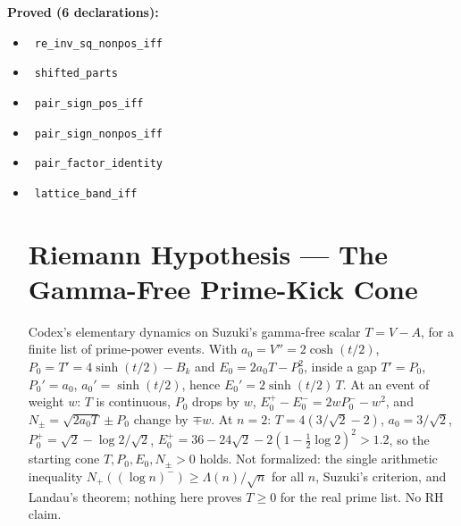\documentclass{report}
\theoremstyle{definition}
\begin{document}
\noindent\textbf{Proved (6 declarations):}
\begin{itemize}
  \item {}\leanok\ \texttt{re\_inv\_sq\_nonpos\_iff}
  \item {}\leanok\ \texttt{shifted\_parts}
  \item {}\leanok\ \texttt{pair\_sign\_pos\_iff}
  \item {}\leanok\ \texttt{pair\_sign\_nonpos\_iff}
  \item {}\leanok\ \texttt{pair\_factor\_identity}
  \item {}\leanok\ \texttt{lattice\_band\_iff}
\section{Riemann Hypothesis --- The Gamma-Free Prime-Kick Cone}
Codex's elementary dynamics on Suzuki's gamma-free scalar $T=V-A$, for a finite list of prime-power events. With $a_0=V''=2\cosh(t/2)$, $P_0=T'=4\sinh(t/2)-B_k$ and $E_0=2a_0T-P_0^2$, inside a gap $T'=P_0$, $P_0'=a_0$, $a_0'=\sinh(t/2)$, hence $E_0'=2\sinh(t/2)\,T$. At an event of weight $w$: $T$ is continuous, $P_0$ drops by $w$, $E_0^+-E_0^-=2wP_0^--w^2$, and $N_\pm=\sqrt{2a_0T}\pm P_0$ change by $\mp w$. At $n=2$: $T=4(3/\sqrt2-2)$, $a_0=3/\sqrt2$, $P_0^+=\sqrt2-\log2/\sqrt2$, $E_0^+=36-24\sqrt2-2(1-\tfrac12\log2)^2>1.2$, so the starting cone $T,P_0,E_0,N_\pm>0$ holds. Not formalized: the single arithmetic inequality $N_+((\log n)^-)\ge\Lambda(n)/\sqrt n$ for all $n$, Suzuki's criterion, and Landau's theorem; nothing here proves $T\ge0$ for the real prime list. No RH claim.


\end{itemize}
\end{document}
